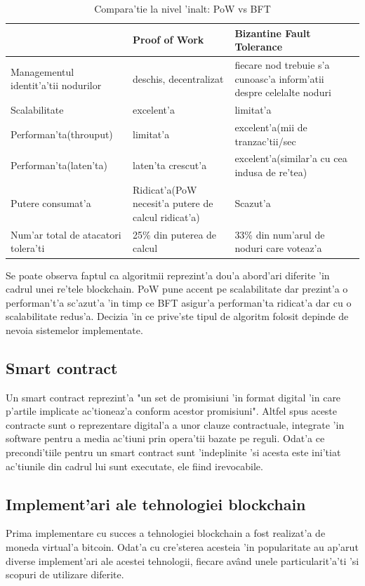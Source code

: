 \documentclass[12pt,a4paper,twoside]{report}
\begin{document}
	

\begin{table}[H]
\caption{Compara'tie la nivel 'inalt: PoW vs BFT}
\centering
\begin{tabular}{|p{5cm}|p{5cm}|p{5cm}|}      
\hline\hline                        
 & Proof of Work & Bizantine Fault Tolerance \\ [0.5ex]  
\hline                             
Managementul identit'a'tii nodurilor & deschis, decentralizat & fiecare nod trebuie s'a cunoasc'a inform'atii despre celelalte noduri\\ 
\hline  
Scalabilitate & excelent'a & limitat'a \\              
\hline 
Performan'ta(throuput) & limitat'a & excelent'a(mii de tranzac'tii/sec	\\
\hline 
Performan'ta(laten'ta) & laten'ta crescut'a & excelent'a(similar'a cu cea indusa de re'tea) \\
\hline 
Putere consumat'a & Ridicat'a(PoW necesit'a putere de calcul ridicat'a) & Scazut'a \\
\hline 
Num'ar total de atacatori tolera'ti & 25\% din puterea de calcul  & 33\% din num'arul de noduri care voteaz'a\\[1ex]
           
\hline                              
\end{tabular}
\label{table1} 
\end{table}

Se poate observa faptul ca algoritmii reprezint'a dou'a abord'ari diferite 'in cadrul unei re'tele blockchain. PoW pune accent pe scalabilitate dar prezint'a o performan't'a sc'azut'a 'in timp ce BFT asigur'a performan'ta ridicat'a dar cu o scalabilitate redus'a. Decizia 'in ce prive'ste tipul de algoritm folosit depinde de nevoia sistemelor implementate.
	\subsection{Smart contract}
	Un smart contract reprezint'a "un set de promisiuni 'in format digital 'in care p'artile implicate ac'tioneaz'a conform acestor promisiuni"\cite{sc}. Altfel spus aceste contracte sunt o reprezentare digital'a a unor clauze contractuale, integrate 'in software pentru a media ac'tiuni prin opera'tii bazate pe reguli. Odat'a ce precondi'tiile pentru un smart contract sunt 'indeplinite 'si acesta este ini'tiat ac'tiunile din cadrul lui sunt executate, ele fiind irevocabile.
	\subsection{Implement'ari ale tehnologiei blockchain}
	Prima implementare cu succes a tehnologiei blockchain a fost realizat'a de moneda virtual'a bitcoin. Odat'a cu cre'sterea acesteia 'in popularitate au ap'arut diverse implement'ari ale acestei tehnologii, fiecare av\^and unele particularit'a'ti 'si scopuri de utilizare diferite.
	
\end{document}
